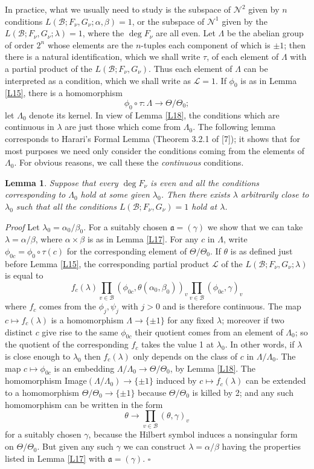\documentclass[12pt]{article}
\def\fa{{\mathfrak a}}
\def\ga{{\alpha}}
\def\gb{{\beta}}
\def\gg{{\gamma}}
\def\gl{{\lambda}}
\def\gL{{\Lambda}}
\def\gT{{\Theta}}
\def\sB{{\mathcal B}}
\def\sL{{\mathcal L}}
\def\sN{{\mathcal N}}
\def\qed{{\hfill$\square$}}
\def\ble{\begin{lemma} \label}
\def\ele{\end{lemma}}
\newtheorem{lemma}{Lemma}
\begin{document}
\medskip

In practice, what we usually need to study is the subspace of $\sN^2$ given by
$n$ conditions $L(\sB;F_\nu,G_\nu;\ga,\gb)=1$, or the subspace of
$\sN^1$ given by the $L(\sB;F_\nu,G_\nu;\gl)=1$, where the $\deg F_\nu$ are
all even. Let $\gL$ be the abelian group
of order $2^n$ whose elements are the $n$-tuples each component of which is
$\pm1$; then there is a natural identification, which we shall write $\tau$,
of each element of $\gL$ with a partial product of the $L(\sB;F_\nu,G_\nu)$.
Thus each element of $\gL$ can be interpreted as a condition, which we shall
write as $\sL=1$. If
$\phi_0$ is as in Lemma \ref{L15}, there is a homomorphism
\[ \phi_0\circ\tau: \gL\rightarrow\gT/\gT_0; \]
let $\gL_0$ denote its kernel. In view of Lemma \ref{L18}, the conditions
which are continuous in $\gl$ are just those which come from
$\gL_0$. The following lemma corresponds to Harari's Formal Lemma (Theorem
3.2.1 of [7]); it shows that for most purposes we need
only consider the conditions coming from the elements of
$\gL_0$. For obvious reasons, we call these the
\emph{continuous} conditions.
\ble{L16} Suppose that every $\deg F_\nu$ is even and all the
conditions corresponding to $\gL_0$ hold at some given
$\gl_0$. Then there exists $\gl$ arbitrarily
close to $\gl_0$ such that all the conditions
$L(\sB;F_\nu,G_\nu)=1$ hold at $\gl$.
\ele
\emph{Proof}
Let $\gl_0=\ga_0/\gb_0$. For a suitably chosen $\fa=(\gg)$ we show that
we can take $\gl=\ga/\gb$, where $\ga\times\gb$ is as in Lemma
\ref{L17}. For any $c$ in $\gL$, write $\phi_{0c}=\phi_0\circ\tau(c)$
for the corresponding element of $\gT/\gT_0$. If
$\theta$ is as defined just before Lemma \ref{L15}, the
corresponding partial product $\sL$ of the
$L(\sB;F_\nu,G_\nu;\gl)$ is equal to
\[ f_c(\gl)\prod_{v\in\sB}(\phi_{0c},\theta(\ga_0,\gb_0))_v
\prod_{v\in\sB}(\phi_{0c},\gg)_v \]
where $f_c$ comes from the $\phi_j,\psi_j$ with $j>0$ and is therefore
continuous. The map $c\mapsto f_c(\gl)$ is a homomorphism $\gL\rightarrow
\{\pm1\}$ for any fixed $\gl$; moreover if two distinct $c$ give rise to the
same $\phi_{0c}$ their quotient comes from an element of
$\gL_0$; so the quotient of the corresponding $f_c$
takes the value 1 at $\gl_0$. In other words, if $\gl$ is close
enough to $\gl_0$ then $f_c(\gl)$ only depends on the class of $c$ in
$\gL/\gL_0$. The map $c\mapsto\phi_{0c}$ is an embedding $\gL/\gL_0
\rightarrow\gT/\gT_0$, by Lemma \ref{L18}. The homomorphism
Image$(\gL/\gL_0)\rightarrow\{\pm1\}$ induced by $c\mapsto f_c(\gl)$ can be
extended to a homomorphism $\gT/\gT_0\rightarrow\{\pm1\}$ because
$\gT/\gT_0$ is killed by 2; and
any such homomorphism can be written in the form
\[ \theta\rightarrow\prod_{v\in\sB}(\theta,\gg)_v \]
for a suitably chosen $\gg$, because the Hilbert symbol induces a
nonsingular form on $\gT/\gT_0$. But 
given any such $\gg$ we can construct
$\gl=\ga/\gb$ having the properties listed in Lemma \ref{L17} with
$\fa=(\gg)$.  \qed
\end{document}
